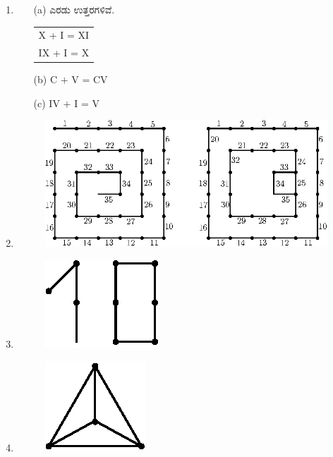 \begin{enumerate}
\item 
\begin{itemize}
\item[(a)] ಎರಡು ಉತ್ತರಗಳಿವೆ. 
\begin{tabular}[t]{l}
X + I = XI\\
IX + I = X
\end{tabular}
\item[(b)] C $+$ V = CV
\item[(c)] IV $+$ I = V 
\end{itemize}

\item 
\begin{figure}[H]
\centering
\includegraphics{images/chap12/ans8.eps}
\end{figure}

\item 
\begin{figure}[H]
\centering
\includegraphics{images/chap12/ans9.eps}
\end{figure}

\item 
\begin{figure}[H]
\centering
\includegraphics{images/chap12/ans10.eps}
\end{figure}


\end{enumerate}
